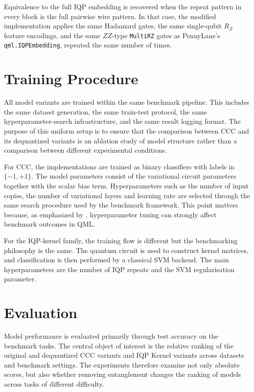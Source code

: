 \documentclass[12pt,a4paper,openany]{report}
\let\textcite\citet
\begin{document}
Equivalence to the full IQP embedding is recovered when the repeat pattern in every block is the full pairwise wire pattern. In that case, the modified implementation applies the same Hadamard gates, the same single-qubit \(R_Z\) feature encodings, and the same \(ZZ\)-type \texttt{MultiRZ} gates as PennyLane's \texttt{qml.IQPEmbedding}, repeated the same number of times.

\section{Training Procedure}

All model variants are trained within the same benchmark pipeline. This includes the same dataset generation, the same train-test protocol, the same hyperparameter-search infrastructure, and the same result logging format. The purpose of this uniform setup is to ensure that the comparison between CCC and its dequantized variants is an ablation study of model structure rather than a comparison between different experimental conditions.

For CCC, the implementations are trained as binary classifiers with labels in $\{-1,+1\}$. The model parameters consist of the variational circuit parameters together with the scalar bias term. Hyperparameters such as the number of input copies, the number of variational layers and learning rate are selected through the same search procedure used by the benchmark framework. This point matters because, as emphasized by \textcite{bowles2024better}, hyperparameter tuning can strongly affect benchmark outcomes in QML.

For the IQP-kernel family, the training flow is different but the benchmarking philosophy is the same. The quantum circuit is used to construct kernel matrices, and classification is then performed by a classical SVM backend. The main hyperparameters are the number of IQP repeats and the SVM regularisation parameter.
\section{Evaluation}

Model performance is evaluated primarily through test accuracy on the benchmark tasks. The central object of interest is the relative ranking of the original and dequantized CCC variants and IQP Kernel variants across datasets and benchmark settings. The experiments therefore examine not only absolute scores, but also whether removing entanglement changes the ranking of models across tasks of different difficulty.
\end{document}
